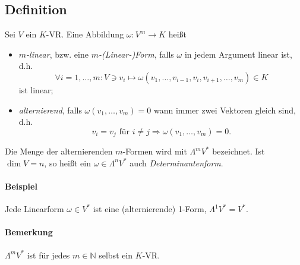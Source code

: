 \subsection{Definition}
	\begin{Definition}
	Sei $ V $ ein $ K $-VR. Eine Abbildung $ \omega:V^m\to K $ heißt
		\begin{itemize}
		\item \emph{$ m $-linear}, bzw. eine \emph{$ m $-(Linear-)Form}, falls $ \omega $ in jedem Argument linear ist, d.h.
			\[ \forall i=1,\dots, m: V\ni v_i\mapsto \omega(v_1,\dots,v_{i-1},v_i,v_{i+1},\dots,v_m)\in K \]
			ist linear;
		\item \emph{alternierend}, falls $ \omega(v_1,\dots,v_m)=0 $ wann immer zwei Vektoren gleich sind, d.h.
			\[ v_i = v_j \text{ für } i\neq j \Rightarrow \omega(v_1,\dots, v_m) = 0. \] 
		\end{itemize}
	Die Menge der alternierenden $ m $-Formen wird mit $ \Lambda^mV^* $ bezeichnet. Ist $ \dim V = n $, so heißt ein $ \omega\in \Lambda^nV^* $ auch \emph{Determinantenform}.
	\end{Definition}

\paragraph{Beispiel}
	Jede Linearform $ \omega\in V^* $ ist eine (alternierende) 1-Form, $ \Lambda^1V^*=V^* $.
\paragraph{Bemerkung}
	$ \Lambda^mV^* $ ist für jedes $ m\in \mathbb{N} $ selbst ein $ K $-VR. 
